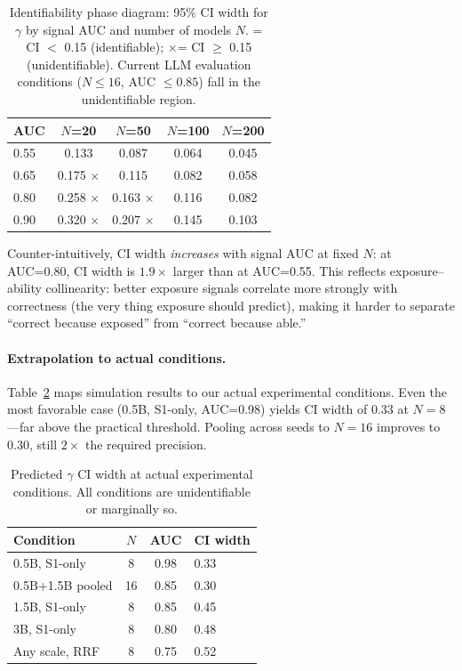 \documentclass[11pt,a4paper]{article}
\newcommand{\cmark}{\checkmark}
\newcommand{\xmark}{$\times$}
\begin{document}
\begin{table}[t]
\centering
\small
\caption{Identifiability phase diagram: 95\% CI width for $\gamma$ by signal AUC and number of models $N$. \cmark = CI $<$ 0.15 (identifiable); \xmark = CI $\geq$ 0.15 (unidentifiable). Current LLM evaluation conditions ($N\leq 16$, AUC $\leq 0.85$) fall in the unidentifiable region.}
\label{tab:identifiability}
\begin{tabular}{lcccc}
\toprule
\textbf{AUC} & $N$=20 & $N$=50 & $N$=100 & $N$=200 \\
\midrule
0.55 & 0.133 \cmark & 0.087 \cmark & 0.064 \cmark & 0.045 \cmark \\
0.65 & 0.175 \xmark & 0.115 \cmark & 0.082 \cmark & 0.058 \cmark \\
0.80 & 0.258 \xmark & 0.163 \xmark & 0.116 \cmark & 0.082 \cmark \\
0.90 & 0.320 \xmark & 0.207 \xmark & 0.145 \cmark & 0.103 \cmark \\
\bottomrule
\end{tabular}
\end{table}

Counter-intuitively, CI width \emph{increases} with signal AUC at fixed $N$: at AUC=0.80, CI width is $1.9\times$ larger than at AUC=0.55.
This reflects exposure--ability collinearity: better exposure signals correlate more strongly with correctness (the very thing exposure should predict), making it harder to separate ``correct because exposed'' from ``correct because able.''

\paragraph{Extrapolation to actual conditions.}
Table~\ref{tab:actual-conditions} maps simulation results to our actual experimental conditions.
Even the most favorable case (0.5B, S1-only, AUC=0.98) yields CI width of 0.33 at $N=8$---far above the practical threshold.
Pooling across seeds to $N=16$ improves to 0.30, still $2\times$ the required precision.

\begin{table}[t]
\centering
\small
\caption{Predicted $\gamma$ CI width at actual experimental conditions. All conditions are unidentifiable or marginally so.}
\label{tab:actual-conditions}
\begin{tabular}{lccl}
\toprule
\textbf{Condition} & $N$ & \textbf{AUC} & \textbf{CI width} \\
\midrule
0.5B, S1-only & 8 & 0.98 & 0.33 \\
0.5B+1.5B pooled & 16 & 0.85 & 0.30 \\
1.5B, S1-only & 8 & 0.85 & 0.45 \\
3B, S1-only & 8 & 0.80 & 0.48 \\
Any scale, RRF & 8 & 0.75 & 0.52 \\
\bottomrule
\end{tabular}
\end{table}
\end{document}
